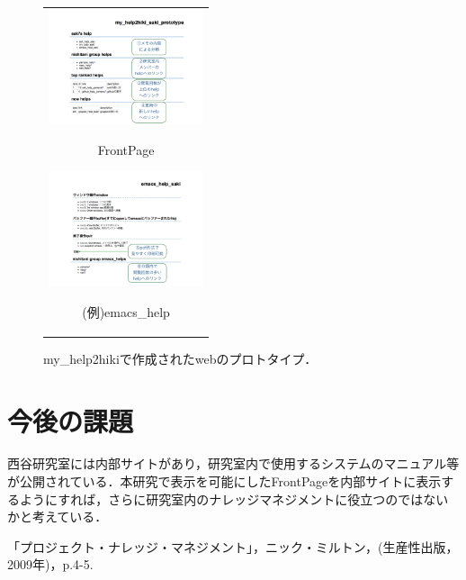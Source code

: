 \documentclass[10pt,a4j,twocolumn]{jsarticle}
\begin{document}
\begin{figure}[htbp]
\begin{center}
\begin{tabular}{c}
\begin{minipage}{0.5\hsize}
\begin{center}
\includegraphics[width=4.5cm,bb=100 100 1000 1000]{my_help2hiki_saki.014.png}
\end{center}
\hspace{1cm} FrontPage

\end{minipage}
\begin{minipage}{0.5\hsize}
\begin{center}
\includegraphics[width=4.5cm,bb=100 100 1000 1000]{my_help2hiki_saki.015.png}
\end{center}
\hspace{1cm} (例)emacs\_help

\end{minipage}
\end{tabular}
\caption{my\_help2hikiで作成されたwebのプロトタイプ．}
\label{fig}
\end{center}
\end{figure}

\section{今後の課題}
西谷研究室には内部サイトがあり，研究室内で使用するシステムのマニュアル等が公開されている．本研究で表示を可能にしたFrontPageを内部サイトに表示するようにすれば，さらに研究室内のナレッジマネジメントに役立つのではないかと考えている．
\begin{thebibliography}{9}
「プロジェクト・ナレッジ・マネジメント」，ニック・ミルトン，(生産性出版，2009年)，p.4-5.
\end{thebibliography}
\end{document}
